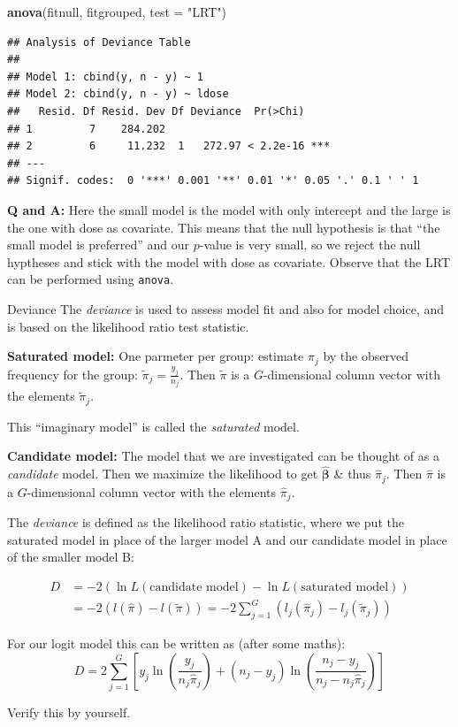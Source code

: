 \documentclass[
  ignorenonframetext,
]{beamer}
\newenvironment{Shaded}{\begin{snugshade}}{\end{snugshade}}
\newcommand{\AttributeTok}[1]{\textcolor[rgb]{0.13,0.29,0.53}{#1}}
\newcommand{\FunctionTok}[1]{\textcolor[rgb]{0.13,0.29,0.53}{\textbf{#1}}}
\newcommand{\NormalTok}[1]{#1}
\newcommand{\StringTok}[1]{\textcolor[rgb]{0.31,0.60,0.02}{#1}}
\begin{document}
\begin{frame}[fragile]
\begin{Shaded}
\begin{Highlighting}[]
\FunctionTok{anova}\NormalTok{(fitnull, fitgrouped, }\AttributeTok{test =} \StringTok{"LRT"}\NormalTok{)}
\end{Highlighting}
\end{Shaded}

\begin{verbatim}
## Analysis of Deviance Table
## 
## Model 1: cbind(y, n - y) ~ 1
## Model 2: cbind(y, n - y) ~ ldose
##   Resid. Df Resid. Dev Df Deviance  Pr(>Chi)    
## 1         7    284.202                          
## 2         6     11.232  1   272.97 < 2.2e-16 ***
## ---
## Signif. codes:  0 '***' 0.001 '**' 0.01 '*' 0.05 '.' 0.1 ' ' 1
\end{verbatim}

\textbf{Q and A:} Here the small model is the model with only intercept
and the large is the one with dose as covariate. This means that the
null hypothesis is that ``the small model is preferred'' and our
\(p\)-value is very small, so we reject the null hyptheses and stick
with the model with dose as covariate. Observe that the LRT can be
performed using \texttt{anova}.
\end{frame}

\begin{frame}{Deviance}
\label{deviance}
The \emph{deviance} is used to assess model fit and also for model
choice, and is based on the likelihood ratio test statistic.

\textbf{Saturated model:} One parmeter per group: estimate \(\pi_j\) by
the observed frequency for the group: \(\tilde{\pi}_j=\frac{y_j}{n_j}\).
Then \(\tilde{\pi}\) is a \(G\)-dimensional column vector with the
elements \(\tilde{\pi}_j\).

This ``imaginary model'' is called the \emph{saturated} model.

\textbf{Candidate model:} The model that we are investigated can be
thought of as a \emph{candidate} model. Then we maximize the likelihood
to get \(\hat{\boldsymbol{\beta}}\) \& thus \(\hat{\pi}_j\). Then
\(\hat{\pi}\) is a \(G\)-dimensional column vector with the elements
\(\hat{\pi}_j\).
\end{frame}

\begin{frame}
The \emph{deviance} is defined as the likelihood ratio statistic, where
we put the saturated model in place of the larger model A and our
candidate model in place of the smaller model B:

\[
\begin{aligned}
D&=-2(\ln L(\text{candidate model})-\ln L(\text{saturated model})) \\
&=-2(l(\hat{\pi})-l(\tilde{\pi}))=
-2\sum_{j=1}^G(l_j(\hat{\pi}_j)-l_j(\tilde{\pi}_j))
\end{aligned}
\]

For our logit model this can be written as (after some maths): \[ 
D=2\sum_{j=1}^G [y_j\ln(\frac{y_j}{n_j\hat{\pi}_j})+(n_j-y_j)\ln(\frac{n_j-y_j}{n_j-n_j\hat{\pi}_j})]
\]

Verify this by yourself.
\end{frame}
\end{document}
